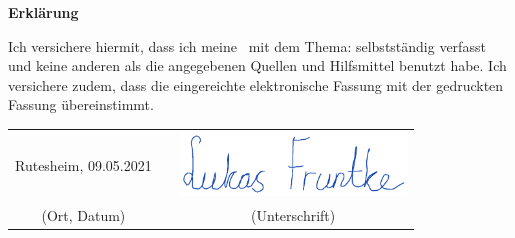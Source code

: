 \clearpage

\thispagestyle{empty}

{\LARGE\textsf{\textbf{Erklärung}}\bigskip}

Ich versichere hiermit, dass ich meine \typMeinerArbeit\ mit dem Thema: \emph{\themaMeinerArbeit} selbstständig verfasst und keine anderen als die angegebenen Quellen und Hilfsmittel benutzt habe.
Ich versichere zudem, dass die eingereichte elektronische Fassung mit der gedruckten Fassung übereinstimmt.

\vspace{3cm}

\begin{center}
\begin{tabular}{ccc}
Rutesheim, 09.05.2021 & \hspace{0.3\linewidth} & \includegraphics[width=6cm]{graphics/Autogramm-Lukas-Frunkte.pdf}\\
(Ort, Datum) & \hspace{0.3\linewidth} & (Unterschrift)
\end{tabular}
\end{center}